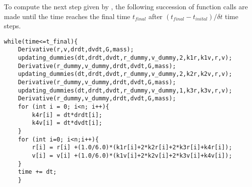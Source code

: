 To compute the next step given by , the following succession of function calls are made until the time reaches the final time $t_{final}$ after $(t_{final} - t_{inital}) / \delta t$ time steps.
\begin{lstlisting}
while(time<=t_final){
    Derivative(r,v,drdt,dvdt,G,mass);
    updating_dummies(dt,drdt,dvdt,r_dummy,v_dummy,2,k1r,k1v,r,v);
    Derivative(r_dummy,v_dummy,drdt,dvdt,G,mass);
    updating_dummies(dt,drdt,dvdt,r_dummy,v_dummy,2,k2r,k2v,r,v);
    Derivative(r_dummy,v_dummy,drdt,dvdt,G,mass);
    updating_dummies(dt,drdt,dvdt,r_dummy,v_dummy,1,k3r,k3v,r,v);
    Derivative(r_dummy,v_dummy,drdt,dvdt,G,mass);
    for (int i = 0; i<n; i++){
        k4r[i] = dt*drdt[i];
        k4v[i] = dt*dvdt[i];
    }
    for (int i=0; i<n;i++){
        r[i] = r[i] +(1.0/6.0)*(k1r[i]+2*k2r[i]+2*k3r[i]+k4r[i]);
        v[i] = v[i] +(1.0/6.0)*(k1v[i]+2*k2v[i]+2*k3v[i]+k4v[i]);
    }
    time += dt;
    }
\end{lstlisting}
 